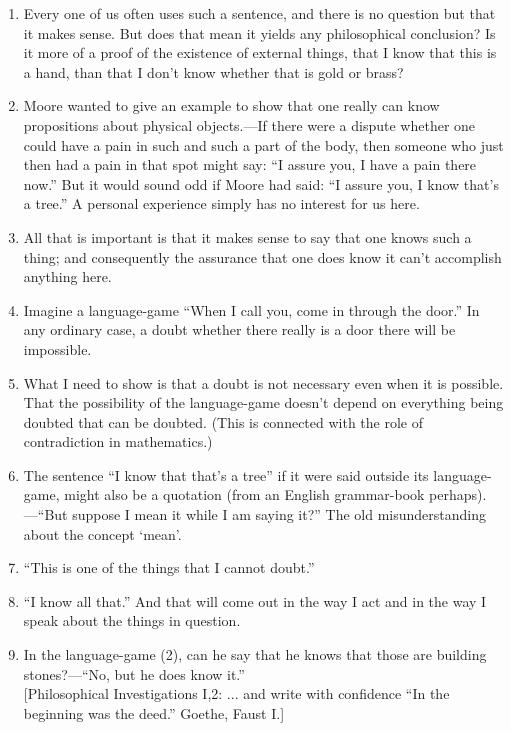 \documentclass{book}
\begin{document}
\begin{enumerate}
\item
Every one of us often uses such a sentence, and there is no question but that
it makes sense. But does that mean it yields any philosophical conclusion? Is
it more of a proof of the existence of external things, that I know that this
is a hand, than that I don't know whether that is gold or brass?

\item
Moore wanted to give an example to show that one really can know propositions
about physical objects.---If there were a dispute whether one could have a pain
in such and such a part of the body, then someone who just then had a pain in
that spot might say: ``I assure you, I have a pain there now.'' But it would
sound odd if Moore had said: ``I assure you, I know that's a tree.'' A personal
experience simply has no interest for us here.

\item
All that is important is that it makes sense to say that one knows such a
thing; and consequently the assurance that one does know it can't accomplish
anything here.

\item
Imagine a language-game ``When I call you, come in through the door.'' In any
ordinary case, a doubt whether there really is a door there will be impossible.

\item
What I need to show is that a doubt is not necessary even when it is possible.
That the possibility of the language-game doesn't depend on everything being
doubted that can be doubted. (This is connected with the role of contradiction
in mathematics.)

\item
The sentence ``I know that that's a tree'' if it were said outside its
language-game, might also be a quotation (from an English grammar-book
perhaps).---``But suppose I mean it while I am saying it?'' The old
misunderstanding about the concept `mean'.

\item
``This is one of the things that I cannot doubt.''

\item
``I know all that.'' And that will come out in the way I act and in the way I
speak about the things in question.

\item
In the language-game (2), can he say that he knows that those are building
stones?---``No, but he does know it.''
\\
{[}Philosophical Investigations I,2: ... and write with confidence ``In the
beginning was the deed.'' Goethe, Faust I.{]}


\end{enumerate}
\end{document}
